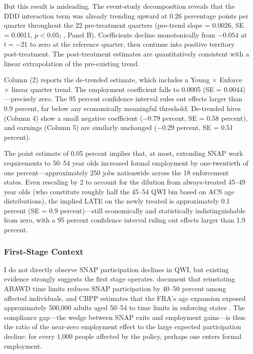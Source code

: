 \documentclass[12pt]{article}
\begin{document}
But this result is misleading. The event-study decomposition reveals that the DDD interaction term was already trending upward at 0.26 percentage points per quarter throughout the 22 pre-treatment quarters (pre-trend slope = 0.0026, SE = 0.0011, $p < 0.05$; , Panel B). Coefficients decline monotonically from $-0.054$ at $t = -21$ to zero at the reference quarter, then continue into positive territory post-treatment. The post-treatment estimates are quantitatively consistent with a linear extrapolation of the pre-existing trend.

Column (2) reports the de-trended estimate, which includes a Young $\times$ Enforce $\times$ linear quarter trend. The employment coefficient falls to 0.0005 (SE = 0.0044)---precisely zero. The 95 percent confidence interval rules out effects larger than 0.9 percent, far below any economically meaningful threshold. De-trended hires (Column 4) show a small negative coefficient ($-0.79$ percent, SE = 0.58 percent), and earnings (Column 5) are similarly unchanged ($-0.29$ percent, SE = 0.51 percent).



The point estimate of 0.05 percent implies that, at most, extending SNAP work requirements to 50--54 year olds increased formal employment by one-twentieth of one percent---approximately 250 jobs nationwide across the 18 enforcement states. Even rescaling by 2 to account for the dilution from always-treated 45--49 year olds (who constitute roughly half the 45--54 QWI bin based on ACS age distributions), the implied LATE on the newly treated is approximately 0.1 percent (SE = 0.9 percent)---still economically and statistically indistinguishable from zero, with a 95 percent confidence interval ruling out effects larger than 1.9 percent.

\subsubsection*{First-Stage Context} I do not directly observe SNAP participation declines in QWI, but existing evidence strongly suggests the first stage operates. \citet{gray2023losing} document that reinstating ABAWD time limits reduces SNAP participation by 40--50 percent among affected individuals, and CBPP estimates that the FRA's age expansion exposed approximately 500,000 adults aged 50--54 to time limits in enforcing states \citep{cbpp2023fra}. The compliance gap---the wedge between SNAP exits and employment gains---is thus the ratio of the near-zero employment effect to the large expected participation decline: for every 1,000 people affected by the policy, perhaps one enters formal employment.
\end{document}
